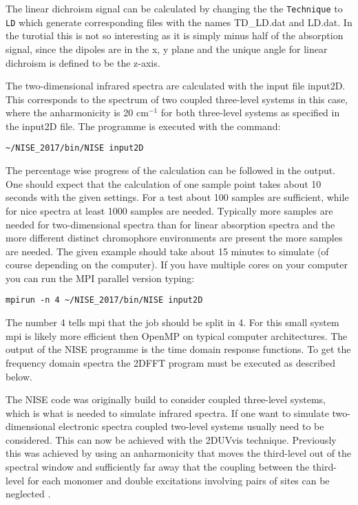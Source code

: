 The linear dichroism signal can be calculated by changing the the {\tt Technique} to {\tt LD} which generate corresponding files with the names TD\_LD.dat and LD.dat. In the turotial this is 
not so interesting as it is simply minus half of the absorption signal, since the dipoles are in the 
x, y plane and the unique angle for linear dichroism is defined to be the z-axis.

The two-dimensional infrared spectra are calculated with the input file input2D. This corresponds to the spectrum of two coupled three-level systems in this case, where the anharmonicity is 20 cm$^{-1}$ for both three-level systems as specified in the input2D file. The programme is executed with the command:
\begin{verbatim}
~/NISE_2017/bin/NISE input2D
\end{verbatim}
The percentage wise progress of the calculation can be followed in the output. One should expect that the calculation of one sample point takes about 10 seconds with the given settings. For a test about 100 samples are sufficient, while for nice spectra at least 1000 samples are needed. Typically more samples are needed for two-dimensional spectra than for linear absorption spectra and the more different distinct chromophore environments are present the more samples are needed. The given example should take about 15 minutes to simulate (of course depending on the computer).
If you have multiple cores on your computer you can run the MPI parallel version typing:
\begin{verbatim}
mpirun -n 4 ~/NISE_2017/bin/NISE input2D
\end{verbatim}
The number 4 tells mpi that the job should be split in 4. For this small system mpi is likely more efficient then OpenMP on typical computer architectures. The output of the NISE programme is the time domain response functions. To get the frequency domain spectra the 2DFFT program must be executed as described below.

The NISE code was originally build to consider coupled three-level systems, which is what is needed to simulate infrared spectra. If one want to simulate two-dimensional electronic spectra coupled two-level systems usually need to be considered. This can now be achieved with the 2DUVvis technique. Previously this was achieved by using an anharmonicity that moves the third-level out of the spectral window and sufficiently far away that the coupling between the third-level for each monomer and double excitations involving pairs of sites can be neglected \cite{Olbrich.2011.JPCB.115.8609,Liang.2012.JCTC.8.1706}. 

